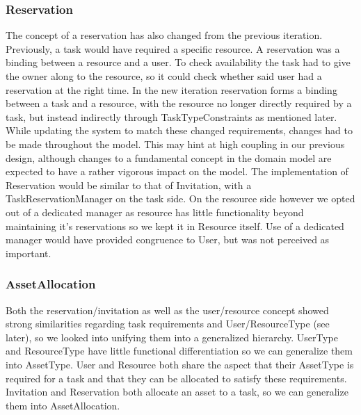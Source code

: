 			\subsubsection{Reservation}
				The concept of a reservation has also changed from the previous iteration. Previously, a task would have required a specific resource. A reservation was a binding between a resource and a user. To check availability the task had to give the owner along to the resource, so it could check whether said user had a reservation at the right time. In the new iteration reservation forms a binding between a task and a resource, with the resource no longer directly required by a task, but instead indirectly through TaskTypeConstraints as mentioned later. While updating the system to match these changed requirements, changes had to be made throughout the model. This may hint at high coupling in our previous design, although changes to a fundamental concept in the domain model are expected to have a rather vigorous impact on the model. The implementation of Reservation would be similar to that of Invitation, with a TaskReservationManager on the task side. On the resource side however we opted out of a dedicated manager as resource has little functionality beyond maintaining it's reservations so we kept it in Resource itself. Use of a dedicated manager would have provided congruence to User, but was not perceived as important. 
			
			\subsubsection{AssetAllocation}
			Both the reservation/invitation as well as the user/resource concept showed strong similarities regarding task requirements and User/ResourceType (see later), so we looked into unifying them into a generalized hierarchy. UserType and ResourceType have little functional differentiation so we can generalize them into AssetType. User and Resource both share the aspect that their AssetType is required for a task and that they can be allocated to satisfy these requirements. Invitation and Reservation both allocate an asset to a task, so we can generalize them into AssetAllocation.
				

